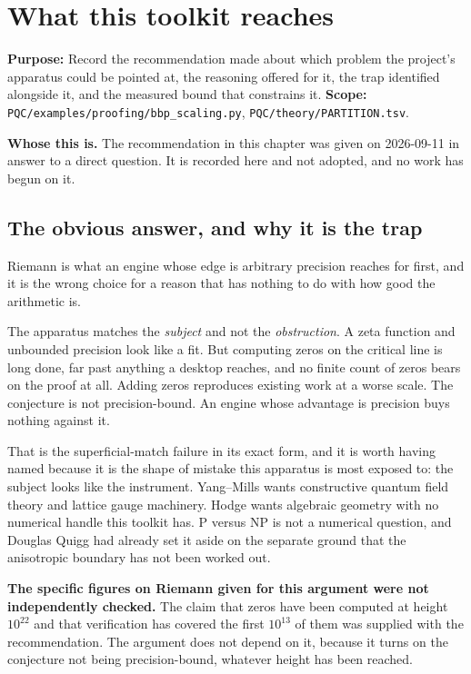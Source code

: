 \chapter{What this toolkit reaches}

\textbf{Purpose:} Record the recommendation made about which problem the project's apparatus could
be pointed at, the reasoning offered for it, the trap identified alongside it, and the measured
bound that constrains it. \textbf{Scope:}
\texttt{PQC/\allowbreak{}examples/\allowbreak{}proofing/\allowbreak{}bbp\_\allowbreak{}scaling.\allowbreak{}py},
\texttt{PQC/\allowbreak{}theory/\allowbreak{}PARTITION.\allowbreak{}tsv}.

\textbf{Whose this is.} The recommendation in this chapter was given on 2026-09-11 in answer
to a direct question. It is recorded here and not adopted, and no work has begun on it.

\section{The obvious answer, and why it is the trap}

Riemann is what an engine whose edge is arbitrary precision reaches for first, and it is the wrong
choice for a reason that has nothing to do with how good the arithmetic is.

The apparatus matches the \emph{subject} and not the \emph{obstruction}. A zeta function and
unbounded precision look like a fit. But computing zeros on the critical line is long done, far past
anything a desktop reaches, and no finite count of zeros bears on the proof at all. Adding zeros
reproduces existing work at a worse scale. The conjecture is not precision-bound. An engine
whose advantage is precision buys nothing against it.

That is the superficial-match failure in its exact form, and it is worth having named because it is
the shape of mistake this apparatus is most exposed to: the subject looks like the instrument.
Yang--Mills wants constructive quantum field theory and lattice gauge machinery. Hodge wants
algebraic geometry with no numerical handle this toolkit has. P versus NP is not a numerical
question, and Douglas Quigg had already set it aside on the separate ground that the anisotropic
boundary has not been worked out.

\textbf{The specific figures on Riemann given for this argument were not independently checked.}
The claim that zeros have been computed at height $10^{22}$ and that verification has covered the
first $10^{13}$ of them was supplied with the recommendation. The
argument does not depend on it, because it turns on the conjecture not being precision-bound,
whatever height has been reached.

